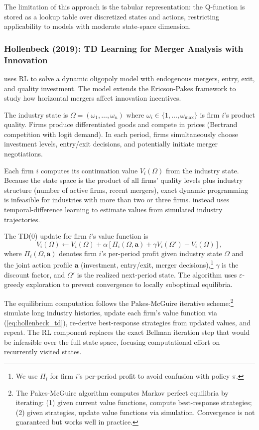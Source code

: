 The limitation of this approach is the tabular representation: the Q-function is stored as a lookup table over discretized states and actions, restricting applicability to models with moderate state-space dimension.


\subsubsection{Hollenbeck (2019): TD Learning for Merger Analysis with Innovation}

\citet{Hollenbeck2019} uses RL to solve a dynamic oligopoly model with endogenous mergers, entry, exit, and quality investment. The model extends the Ericson-Pakes framework to study how horizontal mergers affect innovation incentives.

The industry state is $\Omega = (\omega_1, \ldots, \omega_n)$ where $\omega_i \in \{1, \ldots, \omega_{\max}\}$ is firm $i$'s product quality. Firms produce differentiated goods and compete in prices (Bertrand competition with logit demand). In each period, firms simultaneously choose investment levels, entry/exit decisions, and potentially initiate merger negotiations.

Each firm $i$ computes its continuation value $V_i(\Omega)$ from the industry state. Because the state space is the product of all firms' quality levels plus industry structure (number of active firms, recent mergers), exact dynamic programming is infeasible for industries with more than two or three firms. \citet{Hollenbeck2019} instead uses temporal-difference learning to estimate values from simulated industry trajectories.

The TD(0) update for firm $i$'s value function is
\begin{equation}
V_i(\Omega) \leftarrow V_i(\Omega) + \alpha\left[\Pi_i(\Omega, \mathbf{a}) + \gamma V_i(\Omega') - V_i(\Omega)\right], \label{eq:hollenbeck_td}
\end{equation}
where $\Pi_i(\Omega, \mathbf{a})$ denotes firm $i$'s per-period profit given industry state $\Omega$ and the joint action profile $\mathbf{a}$ (investment, entry/exit, merger decisions),\footnote{We use $\Pi_i$ for firm $i$'s per-period profit to avoid confusion with policy $\pi$.} $\gamma$ is the discount factor, and $\Omega'$ is the realized next-period state. The algorithm uses $\varepsilon$-greedy exploration to prevent convergence to locally suboptimal equilibria.

The equilibrium computation follows the Pakes-McGuire iterative scheme:\footnote{The Pakes-McGuire algorithm \citep{PakesMcGuire1994} computes Markov perfect equilibria by iterating: (1) given current value functions, compute best-response strategies; (2) given strategies, update value functions via simulation. Convergence is not guaranteed but works well in practice.} simulate long industry histories, update each firm's value function via (\ref{eq:hollenbeck_td}), re-derive best-response strategies from updated values, and repeat. The RL component replaces the exact Bellman iteration step that would be infeasible over the full state space, focusing computational effort on recurrently visited states.

